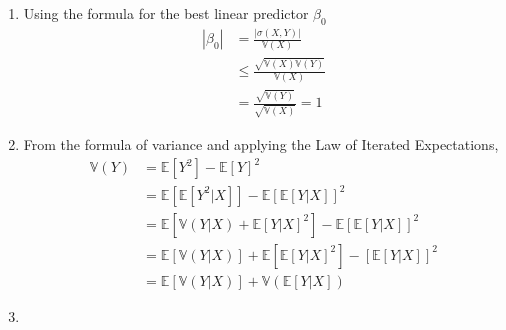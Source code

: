 \documentclass{article}[12pt]
\begin{document}
\begin{enumerate}
    \item Using the formula for the best linear predictor $\beta_0$
    \begin{align*}
        |\beta_0| &= \frac{ | \sigma(X,Y) | }{\mathbb{V}(X)} \\
        &\leq \frac{ \sqrt{\mathbb{V}(X)\mathbb{V}(Y)} }{\mathbb{V}(X)} \\
        &= \frac{ \sqrt{\mathbb{V}(Y)} }{ \sqrt{\mathbb{V}(X)}} = 1
    \end{align*}

    \item From the formula of variance and applying the Law of Iterated Expectations,
    \begin{align*}
        \mathbb{V}(Y) &= \mathbb{E} [Y^2] - \mathbb{E}[Y]^2 \\
        &= \mathbb{E} [ \mathbb{E} [Y^2|X] ] - \mathbb{E} [\mathbb{E}[Y|X]]^2 \\
        &= \mathbb{E} [ \mathbb{V}(Y|X) + \mathbb{E}[Y|X]^2 ] - \mathbb{E} [\mathbb{E}[Y|X]]^2 \\
        &= \mathbb{E} [ \mathbb{V}(Y|X) ] + \mathbb{E} [ \mathbb{E}[Y|X]^2] - [\mathbb{E}[Y|X]]^2 \\
        &= \mathbb{E} [ \mathbb{V}(Y|X) ] + \mathbb{V} ( \mathbb{E} [Y|X])
    \end{align*}

    \item 

\end{enumerate}
\end{document}
